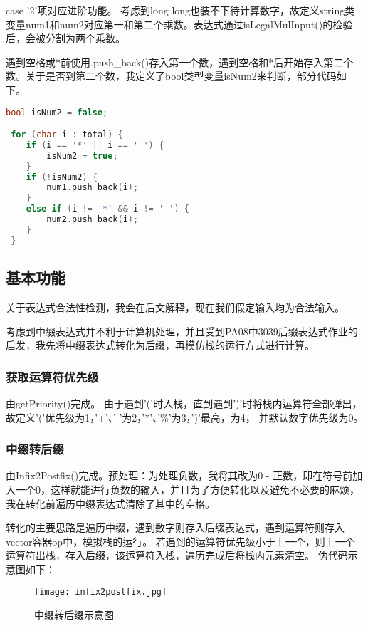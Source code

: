\documentclass[a4paper, 11pt, UTF8]{ctexart}
\begin{document}
case '2'项对应进阶功能。
考虑到long long也装不下待计算数字，故定义string类变量num1和num2对应第一和第二个乘数。表达式通过isLegalMulInput()的检验后，会被分割为两个乘数。

遇到空格或*前使用.push\_back()存入第一个数，遇到空格和*后开始存入第二个数。关于是否到第二个数，我定义了bool类型变量isNum2来判断，部分代码如下。

\begin{lstlisting}[language=C++, basicstyle=\ttfamily]
 bool isNum2 = false;

 for (char i : total) {
	if (i == '*' || i == ' ') {
		isNum2 = true;
	}
	if (!isNum2) {
		num1.push_back(i);
	}
	else if (i != '*' && i != ' ') {
		num2.push_back(i);
	}
 }
\end{lstlisting}

\subsection{基本功能}

关于表达式合法性检测，我会在后文解释，现在我们假定输入均为合法输入。

考虑到中缀表达式并不利于计算机处理，并且受到PA08中3039后缀表达式作业的启发，我先将中缀表达式转化为后缀，再模仿栈的运行方式进行计算。

\subsubsection{获取运算符优先级}

由getPriority()完成。
由于遇到'('时入栈，直到遇到')'时将栈内运算符全部弹出，故定义'('优先级为1，'+'、'-'为2，'*'、'\%'为3，')'最高，为4，
并默认数字优先级为0。

\subsubsection{中缀转后缀}

由Infix2Postfix()完成。预处理：为处理负数，我将其改为0 - 正数，即在符号前加入一个0，这样就能进行负数的输入，并且为了方便转化以及避免不必要的麻烦，
我在转化前遍历中缀表达式清除了其中的空格。

转化的主要思路是遍历中缀，遇到数字则存入后缀表达式，遇到运算符则存入vector容器op中，模拟栈的运行。
若遇到的运算符优先级小于上一个，则上一个运算符出栈，存入后缀，该运算符入栈，遍历完成后将栈内元素清空。
伪代码示意图如下：

\begin{figure}[H]
    \centering
    \texttt{[image: infix2postfix.jpg]}
    \caption{中缀转后缀示意图}
\end{figure}
\end{document}
